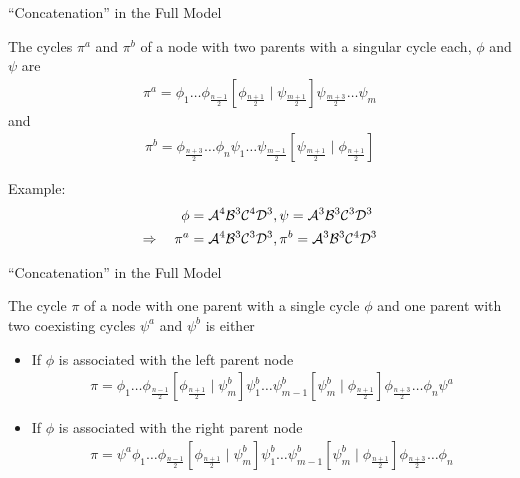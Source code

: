 \begin{frame}{``Concatenation'' in the Full Model}
	\vspace{-1em}
	\begin{theorem}
		The cycles $\pi^a$ and $\pi^b$ of a node with two parents with a singular cycle each, $\phi$ and $\psi$ are
		\begin{align*}
			\pi^a = \phi_1 \dots \phi_{\frac{n-1}{2}} \left[\phi_{\frac{n+1}{2}} \mid \psi_{\frac{m+1}{2}}\right] \psi_{\frac{m+3}{2}} \dots \psi_m
		\end{align*}
		and
		\begin{align*}
			\pi^b =  \phi_{\frac{n+3}{2}} \dots \phi_n \psi_1 \dots \psi_{\frac{m-1}{2}} \left[\psi_{\frac{m+1}{2}} \mid \phi_{\frac{n+1}{2}}\right]
		\end{align*}
	\end{theorem}
	\pause
	Example: \vspace{-2em} \begin{align*}
		\phi                    & = \mathcal{A}^4\mathcal{B}^3\mathcal{C}^4\mathcal{D}^3, \psi = \mathcal{A}^3\mathcal{B}^3\mathcal{C}^3\mathcal{D}^3  \\
		\Rightarrow \quad \pi^a & = \mathcal{A}^4\mathcal{B}^3\mathcal{C}^3\mathcal{D}^3, \pi^b = \mathcal{A}^3\mathcal{B}^3\mathcal{C}^4\mathcal{D}^3
	\end{align*}
\end{frame}

\begin{frame}{``Concatenation'' in the Full Model}
	\vspace{-1em}
	\begin{theorem}
		The cycle $\pi$ of a node with one parent with a single cycle $\phi$ and one parent with two coexisting cycles $\psi^a$ and $\psi^b$ is either
		\begin{itemize}
			\item If $\phi$ is associated with the left parent node
			      \begin{align*}
				      \pi = \phi_1 \dots \phi_{\frac{n-1}{2}} \left[\phi_{\frac{n+1}{2}} \mid \psi^b_m\right] \psi^b_1 \dots \psi^b_{m-1} \left[\psi^b_m \mid \phi_{\frac{n+1}{2}}\right] \phi_{\frac{n+3}{2}} \dots \phi_n \psi^a
			      \end{align*}
			\item If $\phi$ is associated with the right parent node
			      \begin{align*}
				      \pi = \psi^a \phi_1 \dots \phi_{\frac{n-1}{2}} \left[\phi_{\frac{n+1}{2}} \mid \psi^b_m\right] \psi^b_1 \dots \psi^b_{m-1} \left[\psi^b_m \mid \phi_{\frac{n+1}{2}}\right] \phi_{\frac{n+3}{2}} \dots \phi_n
			      \end{align*}
		\end{itemize}
	\end{theorem}
\end{frame}

